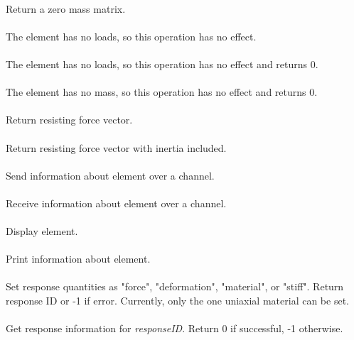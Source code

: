 \\    
Return a zero mass matrix.
\\

 \\	
The element has no loads, so this operation has no effect.
\\

 \\
The element has no loads, so this operation has no effect and returns 0.
\\

 \\    
The element has no mass, so this operation has no effect and returns 0.
\\

 \\
Return resisting force vector.
\\

 \\            
Return resisting force vector with inertia included.
\\

 \\
Send information about element over a channel.
\\

 \\
Receive information about element over a channel.
\\

 \\    
Display element.
\\

 \\    
Print information about element.
\\

 \\
Set response quantities as "force", "deformation", "material", or "stiff".  Return response
ID  or -1 if error.  Currently, only the one uniaxial material can be set.
\\

 \\
Get response information for {\em responseID}.  Return 0 if successful, -1 otherwise.
\\






